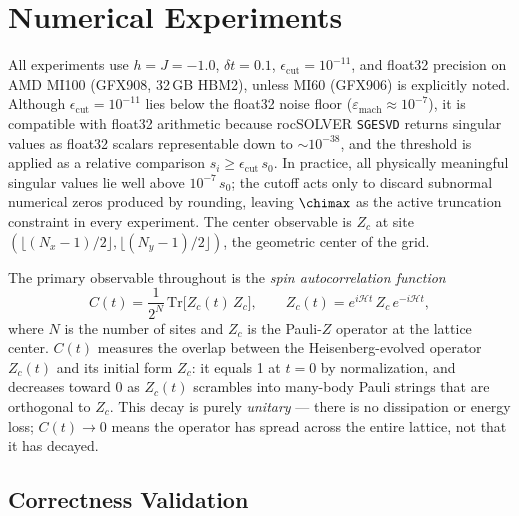 \section{Numerical Experiments}
\label{sec:experiments}

All experiments use $h = J = -1.0$, $\delta t = 0.1$,
$\epsilon_{\mathrm{cut}} = 10^{-11}$, and float32 precision on AMD MI100
(GFX908, 32\,GB HBM2), unless MI60 (GFX906) is explicitly noted.
Although $\epsilon_{\mathrm{cut}} = 10^{-11}$ lies below the float32 noise
floor ($\varepsilon_{\mathrm{mach}} \approx 10^{-7}$), it is compatible with
float32 arithmetic because rocSOLVER \texttt{SGESVD} returns singular values
as float32 scalars representable down to $\sim10^{-38}$, and the threshold is
applied as a relative comparison $s_i \geq \epsilon_{\mathrm{cut}}\,s_0$.
In practice, all physically meaningful singular values lie well above
$10^{-7}\,s_0$; the cutoff acts only to discard subnormal numerical zeros
produced by rounding, leaving $\chimax$ as the active truncation constraint
in every experiment.
The center observable is $Z_c$ at site $(\lfloor(N_x-1)/2\rfloor,\lfloor(N_y-1)/2\rfloor)$,
the geometric center of the grid.

The primary observable throughout is the \emph{spin autocorrelation function}
\begin{equation}
  C(t) = \frac{1}{2^N}\,\mathrm{Tr}\bigl[Z_c(t)\,Z_c\bigr],
  \qquad
  Z_c(t) = e^{i\mathcal{H}t}\,Z_c\,e^{-i\mathcal{H}t},
  \label{eq:ct_def}
\end{equation}
where $N$ is the number of sites and $Z_c$ is the Pauli-$Z$ operator at the
lattice center.
$C(t)$ measures the overlap between the Heisenberg-evolved operator $Z_c(t)$
and its initial form $Z_c$: it equals 1 at $t=0$ by normalization, and
decreases toward 0 as $Z_c(t)$ scrambles into many-body Pauli strings
that are orthogonal to $Z_c$.
This decay is purely \emph{unitary} --- there is no dissipation or energy loss;
$C(t) \to 0$ means the operator has spread across the entire lattice,
not that it has decayed.

\subsection{Correctness Validation}
\label{sec:correctness}

